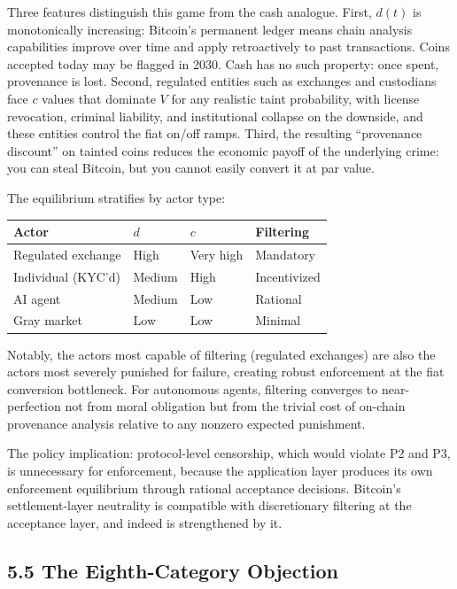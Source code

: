 \documentclass[12pt]{article}
\theoremstyle{definition}
\theoremstyle{remark}
\begin{document}
Three features distinguish this game from the cash analogue. First,
$d(t)$ is monotonically increasing: Bitcoin's permanent
ledger means chain analysis capabilities improve over time and apply
retroactively to past transactions. Coins accepted today may be flagged
in 2030. Cash has no such property: once spent, provenance is lost.
Second, regulated entities such as exchanges and custodians face $c$
values that dominate $V$ for any realistic taint probability, with
license revocation, criminal liability, and institutional collapse on
the downside, and these entities control the fiat on/off ramps. Third,
the resulting ``provenance discount'' on tainted coins reduces the
economic payoff of the underlying crime: you can steal Bitcoin, but
you cannot easily convert it at par value.

The equilibrium stratifies by actor type:

\begin{table}[h]
\centering
\begin{tabular}{llll}
\toprule
Actor & $d$ & $c$ & Filtering \\
\midrule
Regulated exchange & High & Very high & Mandatory \\
Individual (KYC'd) & Medium & High & Incentivized \\
AI agent & Medium & Low & Rational \\
Gray market & Low & Low & Minimal \\
\bottomrule
\end{tabular}
\end{table}

Notably, the actors most capable of filtering (regulated exchanges) are
also the actors most severely punished for failure, creating robust
enforcement at the fiat conversion bottleneck. For autonomous agents,
filtering converges to near-perfection not from moral obligation but
from the trivial cost of on-chain provenance analysis relative to any
nonzero expected punishment.

The policy implication: protocol-level censorship, which would violate
P2 and P3, is unnecessary for enforcement, because the application
layer produces its own enforcement equilibrium through rational
acceptance decisions. Bitcoin's settlement-layer neutrality is
compatible with discretionary filtering at the acceptance layer, and
indeed is strengthened by it.

\subsection{5.5 The Eighth-Category Objection}
\end{document}
